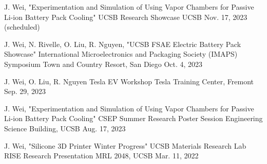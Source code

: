 


\begin{cventries}

\cventry
{J. Wei, "Experimentation and Simulation of Using Vapor Chambers for Passive Li-ion Battery Pack Cooling"} %
{UCSB Research Showcase} %
{UCSB} %
{Nov. 17, 2023 (scheduled)} %
{ %
\begin{cvitems}
\end{cvitems}
}

\cventry
{J. Wei, N. Rivelle, O. Liu, R. Nguyen, "UCSB FSAE Electric Battery Pack Showcase"} %
{International Microelectronics and Packaging Society (IMAPS) Symposium} %
{Town and Country Resort, San Diego} %
{Oct. 4, 2023} %
{ %
\begin{cvitems}
\end{cvitems}
}


\cventry
{J. Wei, O. Liu, R. Nguyen} %
{Tesla EV Workshop} %
{Tesla Training Center, Fremont} %
{Sep. 29, 2023} %
{ %
\begin{cvitems}
\end{cvitems}
}


\cventry
{J. Wei, "Experimentation and Simulation of Using Vapor Chambers for Passive Li-ion Battery Pack Cooling"} %
{CSEP Summer Research Poster Session} %
{Engineering Science Building, UCSB} %
{Aug. 17, 2023} %
{ %
\begin{cvitems}
\end{cvitems}
}

\cventry
{J. Wei, "Silicone 3D Printer Winter Progress"} %
{UCSB Materials Research Lab RISE Research Presentation} %
{MRL 2048, UCSB} %
{Mar. 11, 2022} %
{ %
\begin{cvitems}
\end{cvitems}
}



\end{cventries}